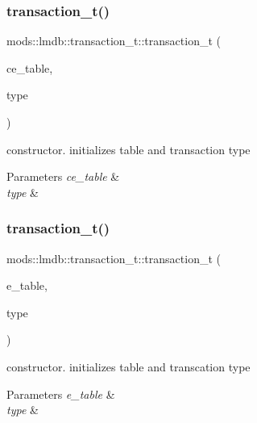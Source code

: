 \subsubsection{\texorpdfstring{transaction\+\_\+t()}{transaction\_t()}\hspace{0.1cm}{\footnotesize\ttfamily [1/2]}}
{\footnotesize\ttfamily mods\+::lmdb\+::transaction\+\_\+t\+::transaction\+\_\+t (\begin{DoxyParamCaption}\item[{std\+::string}]{ce\+\_\+table,  }\item[{transact\+\_\+type\+\_\+t}]{type }\end{DoxyParamCaption})}



constructor. initializes table and transaction type 


\begin{DoxyParams}{Parameters}
{\em ce\+\_\+table} & \\
\hline
{\em type} & \\
\hline
\end{DoxyParams}
\mbox{\label{structmods_1_1lmdb_1_1transaction__t_a516bc4084eb3ed2b282e7d059b2ef409}} 
\subsubsection{\texorpdfstring{transaction\+\_\+t()}{transaction\_t()}\hspace{0.1cm}{\footnotesize\ttfamily [2/2]}}
{\footnotesize\ttfamily mods\+::lmdb\+::transaction\+\_\+t\+::transaction\+\_\+t (\begin{DoxyParamCaption}\item[{table\+\_\+type\+\_\+t}]{e\+\_\+table,  }\item[{transact\+\_\+type\+\_\+t}]{type }\end{DoxyParamCaption})}



constructor. initializes table and transcation type 


\begin{DoxyParams}{Parameters}
{\em e\+\_\+table} & \\
\hline
{\em type} & \\
\hline
\end{DoxyParams}


